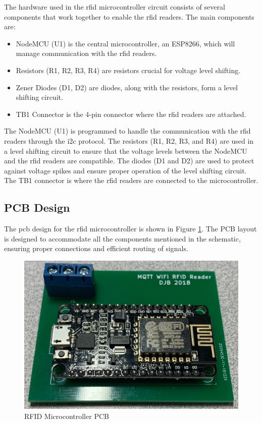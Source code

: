 The hardware used in the \gls{rfid} microcontroller circuit consists of several components that work together to enable the \gls{rfid} readers. The main components are:
\begin{itemize}
\item NodeMCU (U1) is the central microcontroller, an ESP8266, which will manage communication with the \gls{rfid} readers.
\item Resistors (R1, R2, R3, R4) are resistors crucial for voltage level shifting.
\item Zener Diodes (D1, D2) are diodes, along with the resistors, form a level shifting circuit.
\item TB1 Connector is the 4-pin connector where the \gls{rfid} readers are attached.
\end{itemize}
The NodeMCU (U1) is programmed to handle the communication with the \gls{rfid} readers through the \gls{i2c} protocol. The resistors (R1, R2, R3, and R4) are used in a level shifting circuit to ensure that the voltage levels between the 
NodeMCU and the \gls{rfid} readers are compatible. The diodes (D1 and D2) are used to protect against voltage spikes and ensure proper operation of the level shifting circuit. The TB1 connector is where the \gls{rfid} readers are connected to the microcontroller.

\subsection{PCB Design}
The \gls{pcb} design for the \gls{rfid} microcontroller is shown in Figure \ref{fig:rfid_pcb}. The PCB layout is designed to accommodate all the components mentioned in the schematic, ensuring proper 
connections and efficient routing of signals.

\begin{figure}[H]
  \centering
    \includegraphics[scale=0.15]{../Images/rfid_pcb.png}
  \caption{RFID Microcontroller PCB}
  \label{fig:rfid_pcb}
\end{figure}
